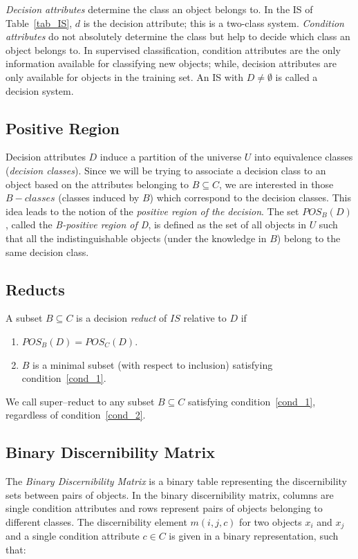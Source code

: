 \documentclass[number,preprint,review,12pt]{elsarticle}
\begin{document}
  \textit{Decision attributes} determine the class an object belongs to. In the IS of Table~\ref{tab_IS}, $d$ is the decision attribute; this is a two-class system. \textit{Condition attributes} do not absolutely determine the class but help to decide which class an object belongs to. In supervised classification, condition attributes are the only information available for classifying new objects; while, decision attributes are only available for objects in the training set. An IS with $D \neq \emptyset$ is called a decision system.
  
\subsection{Positive Region}\label{subsect_Pos}
  Decision attributes $D$ induce a partition of the universe $U$ into equivalence classes (\textit{decision classes}). Since we will be trying to associate a decision class to an object based on the attributes belonging to $B \subseteq C$, we are interested in those $B-classes$ (classes induced by $B$) which correspond to the decision classes. This idea leads to the notion of the  \textit{positive region of the decision}. The set $POS_B(D)$, called the \textit{B-positive region of D}, is defined as the set of all objects in $U$ such that all the indistinguishable objects (under the knowledge in $B$) belong to the same decision class.
 
\subsection{Reducts}\label{def_reduct}
  A subset $B \subseteq C$ is a decision \textit{reduct} of $IS$ relative to $D$ if
  \begin{enumerate}
  	\item $POS_B(D)=POS_C(D)$. \label{cond_1}
  	\item $B$ is a minimal subset (with respect to inclusion) satisfying condition~\ref{cond_1}.\label{cond_2}
  \end{enumerate}

  We call super--reduct to any subset $B \subseteq C$ satisfying condition~\ref{cond_1}, regardless of condition~\ref{cond_2}.
  
%  
\subsection{Binary Discernibility Matrix}
  The \textit{Binary Discernibility Matrix} is a binary table representing the discernibility sets between pairs 
  of objects. In the binary discernibility matrix, columns are single condition attributes and rows represent pairs of objects belonging to different classes. The discernibility element $m(i, j, c)$ for two objects $x_i$ and $x_j$ and a single condition attribute $c \in C$ is given in a binary representation, such that:
  
\end{document}
